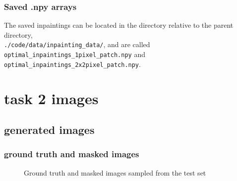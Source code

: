 \documentclass{article}
\begin{document}
\begin{enumerate}
    \subsubsection{Saved .npy arrays}

    The saved inpaintings can be located in the directory relative to the parent
    directory, \\ \texttt{./code/data/inpainting\_data/}, and are called
    \\ \texttt{optimal\_inpaintings\_1pixel\_patch.npy} and \\ \texttt{optimal\_inpaintings\_2x2pixel\_patch.npy}.
    
\end{enumerate}

\newpage

\appendix

\section{task 2 images}

\subsection{generated images}

\subsubsection{ground truth and masked images}

\begin{figure}[H]
  \centering
  \caption{Ground truth and masked images sampled from the test set}
\end{figure}
\end{document}
